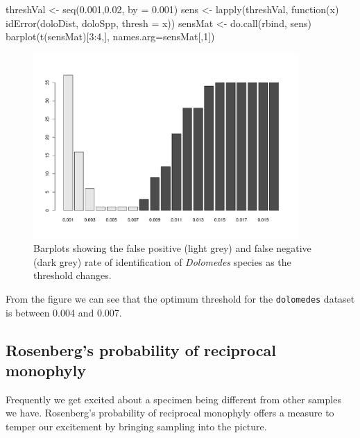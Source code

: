 \documentclass{article}
\newcommand{\fun}[1]{\texttt{#1}}
\begin{document}
\begin{console}
threshVal <- seq(0.001,0.02, by = 0.001)
sens <- lapply(threshVal, function(x) idError(doloDist, doloSpp, thresh = x))
sensMat <- do.call(rbind, sens)
barplot(t(sensMat)[3:4,], names.arg=sensMat[,1])
\end{console}

\begin{figure}[p]
	\centering
	\includegraphics[width=0.9\textwidth]{sensitivity}
	\caption{Barplots showing the false positive (light grey) and false negative (dark grey) rate of identification of \emph{Dolomedes} species as the threshold changes.}
	\label{sensitivity.fig}
\end{figure}

From the figure we can see that the optimum threshold for the \fun{dolomedes} dataset is between 0.004 and 0.007. 


\subsection{Rosenberg's probability of reciprocal monophyly}
Frequently we get excited about a specimen being different from other samples we have. Rosenberg's probability of reciprocal monophyly offers a measure to temper our excitement by bringing sampling into the picture. 

\end{document}
